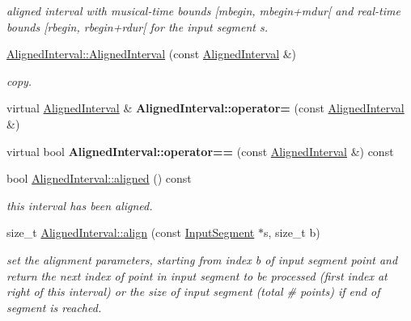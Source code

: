 \begin{DoxyCompactItemize}
\begin{DoxyCompactList}\small\item\em aligned interval with musical-\/time bounds \mbox{[}mbegin, mbegin+mdur\mbox{[} and real-\/time bounds \mbox{[}rbegin, rbegin+rdur\mbox{[} for the input segment s. \end{DoxyCompactList}\item 
\mbox{\label{group__segment_ga5bf2bf3fe1a1791989ec52969aace0a5}} 
\mbox{\hyperlink{group__segment_ga5bf2bf3fe1a1791989ec52969aace0a5}{Aligned\+Interval\+::\+Aligned\+Interval}} (const \mbox{\hyperlink{classAlignedInterval}{Aligned\+Interval}} \&)
\begin{DoxyCompactList}\small\item\em copy. \end{DoxyCompactList}\item 
\mbox{\label{group__segment_ga304aac2ec620d785bbfb67996a7a613b}} 
virtual \mbox{\hyperlink{classAlignedInterval}{Aligned\+Interval}} \& {\bfseries Aligned\+Interval\+::operator=} (const \mbox{\hyperlink{classAlignedInterval}{Aligned\+Interval}} \&)
\item 
\mbox{\label{group__segment_ga40f7de6ee8d8b73172ca1dbfa54bfe62}} 
virtual bool {\bfseries Aligned\+Interval\+::operator==} (const \mbox{\hyperlink{classAlignedInterval}{Aligned\+Interval}} \&) const
\item 
\mbox{\label{group__segment_gaeb6593290d19ff04137c3f3c3e9e3175}} 
bool \mbox{\hyperlink{group__segment_gaeb6593290d19ff04137c3f3c3e9e3175}{Aligned\+Interval\+::aligned}} () const
\begin{DoxyCompactList}\small\item\em this interval has been aligned. \end{DoxyCompactList}\item 
size\+\_\+t \mbox{\hyperlink{group__segment_ga25f42094dbb3623c73df11dd85596185}{Aligned\+Interval\+::align}} (const \mbox{\hyperlink{classInputSegment}{Input\+Segment}} $\ast$s, size\+\_\+t b)
\begin{DoxyCompactList}\small\item\em set the alignment parameters, starting from index b of input segment point and return the next index of point in input segment to be processed (first index at right of this interval) or the size of input segment (total \# points) if end of segment is reached. \end{DoxyCompactList}\item 

\end{DoxyCompactItemize}
